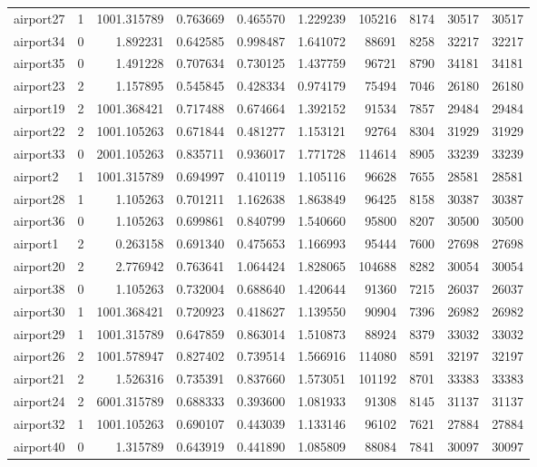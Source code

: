 \begin{longtable}{|l|r|r|r|r|r|r|r|r|r|}
airport27 & 1 & 1001.315789 & 0.763669 & 0.465570 & 1.229239 & 105216 & 8174 & 30517 & 30517 \\
airport34 & 0 & 1.892231 & 0.642585 & 0.998487 & 1.641072 & 88691 & 8258 & 32217 & 32217 \\
airport35 & 0 & 1.491228 & 0.707634 & 0.730125 & 1.437759 & 96721 & 8790 & 34181 & 34181 \\
airport23 & 2 & 1.157895 & 0.545845 & 0.428334 & 0.974179 & 75494 & 7046 & 26180 & 26180 \\
airport19 & 2 & 1001.368421 & 0.717488 & 0.674664 & 1.392152 & 91534 & 7857 & 29484 & 29484 \\
airport22 & 2 & 1001.105263 & 0.671844 & 0.481277 & 1.153121 & 92764 & 8304 & 31929 & 31929 \\
airport33 & 0 & 2001.105263 & 0.835711 & 0.936017 & 1.771728 & 114614 & 8905 & 33239 & 33239 \\
airport2 & 1 & 1001.315789 & 0.694997 & 0.410119 & 1.105116 & 96628 & 7655 & 28581 & 28581 \\
airport28 & 1 & 1.105263 & 0.701211 & 1.162638 & 1.863849 & 96425 & 8158 & 30387 & 30387 \\
airport36 & 0 & 1.105263 & 0.699861 & 0.840799 & 1.540660 & 95800 & 8207 & 30500 & 30500 \\
airport1 & 2 & 0.263158 & 0.691340 & 0.475653 & 1.166993 & 95444 & 7600 & 27698 & 27698 \\
airport20 & 2 & 2.776942 & 0.763641 & 1.064424 & 1.828065 & 104688 & 8282 & 30054 & 30054 \\
airport38 & 0 & 1.105263 & 0.732004 & 0.688640 & 1.420644 & 91360 & 7215 & 26037 & 26037 \\
airport30 & 1 & 1001.368421 & 0.720923 & 0.418627 & 1.139550 & 90904 & 7396 & 26982 & 26982 \\
airport29 & 1 & 1001.315789 & 0.647859 & 0.863014 & 1.510873 & 88924 & 8379 & 33032 & 33032 \\
airport26 & 2 & 1001.578947 & 0.827402 & 0.739514 & 1.566916 & 114080 & 8591 & 32197 & 32197 \\
airport21 & 2 & 1.526316 & 0.735391 & 0.837660 & 1.573051 & 101192 & 8701 & 33383 & 33383 \\
airport24 & 2 & 6001.315789 & 0.688333 & 0.393600 & 1.081933 & 91308 & 8145 & 31137 & 31137 \\
airport32 & 1 & 1001.105263 & 0.690107 & 0.443039 & 1.133146 & 96102 & 7621 & 27884 & 27884 \\
airport40 & 0 & 1.315789 & 0.643919 & 0.441890 & 1.085809 & 88084 & 7841 & 30097 & 30097 \\

\end{longtable}
